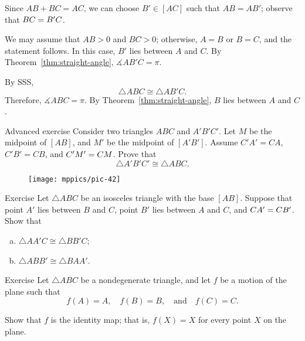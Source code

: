 Since $AB+BC=AC$, we can choose $B'\in [AC]$ such that $AB=AB'$;
observe that $BC=B'C$.

We may assume that $AB>0$ and $BC>0$;
otherwise, $A=B$ or $B=C$, and the statement follows.
In this case, $B'$ lies between $A$ and $C$.
By Theorem~\ref{thm:straight-angle}, $\measuredangle AB'C=\pi$.

By SSS, 
\[\triangle ABC\cong \triangle AB'C.\]
Therefore, $\measuredangle ABC=\pi$.
By Theorem~\ref{thm:straight-angle}, $B$ lies between $A$ and $C$.
\qeds



\begin{thm}{Advanced exercise}\label{ex:SMS}
Consider two triangles $A B C$ and $A' B' C'$.
Let $M$ be the midpoint of $[A B]$, and
$M'$ be the midpoint of $[A' B']$.
Assume $C' A'=C A$, $C' B'= C B$, and $C' M'= C M$.
Prove that
\[\triangle A' B' C'\cong\triangle A B C.\]

\end{thm}

{

\begin{wrapfigure}[6]{r}{26mm}
\vskip-0mm
\centering
\texttt{[image: mppics/pic-42]}
\end{wrapfigure}

\begin{thm}{Exercise}\label{ex:isos-sides}
Let $\triangle A B C$ be an isosceles triangle with the base $[A B]$.
Suppose that point $A'$ lies between $B$ and $C$,
point $B'$ lies between $A$ and $C$,
and $C A'=C B'$.
Show that
\begin{enumerate}[(a)]
\item $\triangle A A' C\cong \triangle B B' C$;
\item $\triangle A B B'\cong \triangle B A A'$.
\end{enumerate}

\end{thm}

\begin{thm}{Exercise}\label{ex:ABC-motion}
Let $\triangle ABC$ be a nondegenerate triangle, and
let $f$ be a motion of the plane 
such that 
$$f(A)=A,
\quad 
f(B)=B,
\quad 
\text{and}
\quad
f(C)=C.$$

Show that $f$ is the identity map;
that is, $f(X)=X$ for every point $X$ on the plane.
\end{thm}

}



